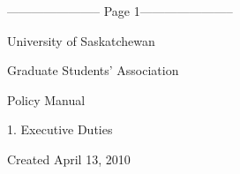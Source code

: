 ﻿----------------------- Page 1-----------------------

  

  

  

  

  

  

  

  

                                                        

                                             University of Saskatchewan  

                                                                          

                                          Graduate Students’ Association  

  

  

  

  

  

  

  

  

  

  

  

  

  

  

  

  

  

  

  

  

  

  

  

                                                     Policy Manual  

                                                        

                                              1. Executive Duties  

  

  

  

  

  

  

  

Created April 13, 2010  

  

